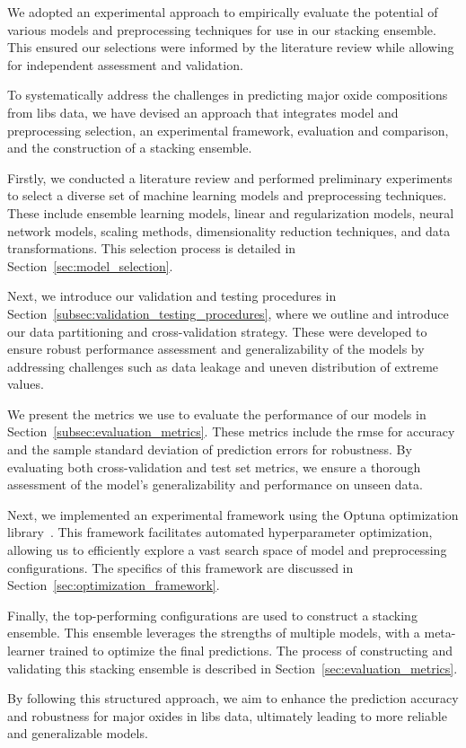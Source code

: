 We adopted an experimental approach to empirically evaluate the potential of various models and preprocessing techniques for use in our stacking ensemble. 
This ensured our selections were informed by the literature review while allowing for independent assessment and validation.

To systematically address the challenges in predicting major oxide compositions from \gls{libs} data, we have devised an approach that integrates model and preprocessing selection, an experimental framework, evaluation and comparison, and the construction of a stacking ensemble.

Firstly, we conducted a literature review and performed preliminary experiments to select a diverse set of machine learning models and preprocessing techniques.
These include ensemble learning models, linear and regularization models, neural network models, scaling methods, dimensionality reduction techniques, and data transformations.
This selection process is detailed in Section~\ref{sec:model_selection}.

Next, we introduce our validation and testing procedures in Section~\ref{subsec:validation_testing_procedures}, where we outline and introduce our data partitioning and cross-validation strategy.
These were developed to ensure robust performance assessment and generalizability of the models by addressing challenges such as data leakage and uneven distribution of extreme values.

We present the metrics we use to evaluate the performance of our models in Section~\ref{subsec:evaluation_metrics}.
These metrics include the \gls{rmse} for accuracy and the sample standard deviation of prediction errors for robustness.
By evaluating both cross-validation and test set metrics, we ensure a thorough assessment of the model's generalizability and performance on unseen data.

Next, we implemented an experimental framework using the Optuna optimization library~\cite{optuna_2019}.
This framework facilitates automated hyperparameter optimization, allowing us to efficiently explore a vast search space of model and preprocessing configurations.
The specifics of this framework are discussed in Section~\ref{sec:optimization_framework}.

Finally, the top-performing configurations are used to construct a stacking ensemble.
This ensemble leverages the strengths of multiple models, with a meta-learner trained to optimize the final predictions.
The process of constructing and validating this stacking ensemble is described in Section~\ref{sec:evaluation_metrics}.

By following this structured approach, we aim to enhance the prediction accuracy and robustness for major oxides in \gls{libs} data, ultimately leading to more reliable and generalizable models.





